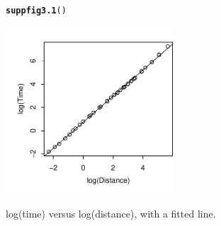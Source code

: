 \documentclass[12pt, a4paper,  BCOR=8.25mm, DIV=15]{scrartcl}\usepackage[]{graphicx}\usepackage[]{color}
\makeatletter
\newcommand{\hlstd}[1]{\textcolor[rgb]{0.345,0.345,0.345}{#1}}%
\newcommand{\hlkwd}[1]{\textcolor[rgb]{0.737,0.353,0.396}{\textbf{#1}}}%
\newenvironment{kframe}{%
 \def\at@end@of@kframe{}%
 \ifinner\ifhmode%
  \def\at@end@of@kframe{\end{minipage}}%
  \begin{minipage}{\columnwidth}%
 \fi\fi%
 \def\FrameCommand##1{\hskip\@totalleftmargin \hskip-\fboxsep
 \colorbox{shadecolor}{##1}\hskip-\fboxsep
     \hskip-\linewidth \hskip-\@totalleftmargin \hskip\columnwidth}%
 \MakeFramed {\advance\hsize-\width
   \@totalleftmargin\z@ \linewidth\hsize
   \@setminipage}}%
 {\par\unskip\endMakeFramed%
 \at@end@of@kframe}
\newenvironment{knitrout}{}{} %
\makeatother
\begin{document}
\begin{suppfigure}
\begin{knitrout}
\color{fgcolor}\begin{kframe}
\begin{alltt}
\hlkwd{suppfig3.1}\hlstd{()}
\end{alltt}
\end{kframe}

{\centering \includegraphics[width=0.47\textwidth]{figure/exs-suppfig3_1e-1} 

}



\end{knitrout}
\caption{log(time) versus log(distance), with a fitted line.}
\end{suppfigure}
\end{document}
